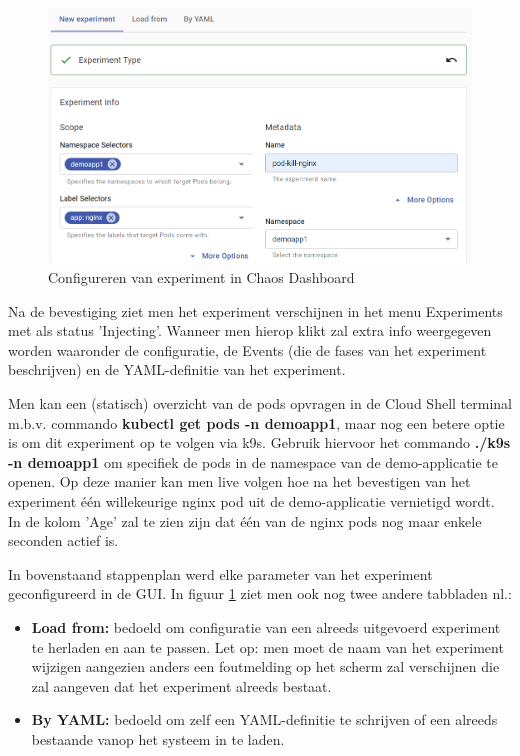 \begin{figure}[h]
    \centering
    \includegraphics[scale=.7]{img/experiment-info.png}
    \caption{Configureren van experiment in Chaos Dashboard}
    \label{img:config-in-dashboard}
\end{figure}

Na de bevestiging ziet men het experiment verschijnen in het menu Experiments met als status 'Injecting'. Wanneer men hierop klikt zal extra info weergegeven worden waaronder de configuratie, de Events (die de fases van het experiment beschrijven) en de YAML-definitie van het experiment. 

Men kan een (statisch) overzicht van de pods opvragen in de Cloud Shell terminal m.b.v. commando {\bf kubectl get pods -n demoapp1}, maar nog een betere optie is om dit experiment op te volgen via k9s. Gebruik hiervoor het commando {\bf ./k9s -n demoapp1} om specifiek de pods in de namespace van de demo-applicatie te openen. Op deze manier kan men live volgen hoe na het bevestigen van het experiment één willekeurige nginx pod uit de demo-applicatie vernietigd wordt.
In de kolom 'Age' zal te zien zijn dat één van de nginx pods nog maar enkele seconden actief is. 

In bovenstaand stappenplan werd elke parameter van het experiment geconfigureerd in de GUI. In figuur \ref{img:config-in-dashboard} ziet men ook nog twee andere tabbladen nl.:
\begin{itemize}
    \item {\bf Load from:} bedoeld om configuratie van een alreeds uitgevoerd experiment te herladen en aan te passen. Let op: men moet de naam van het experiment wijzigen aangezien anders een foutmelding op het scherm zal verschijnen die zal aangeven dat het experiment alreeds bestaat.
    \item {\bf By YAML:} bedoeld om zelf een YAML-definitie te schrijven of een alreeds bestaande vanop het systeem in te laden.
\end{itemize} 

